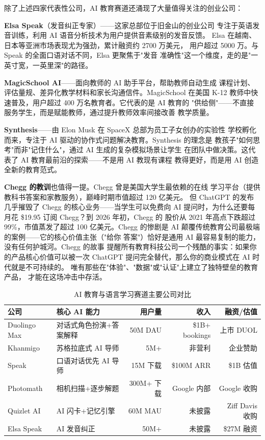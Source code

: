 除了上述四家代表性公司，AI 教育赛道还涌现了大量值得关注的创业公司：

\textbf{Elsa Speak}（发音纠正专家）——这家总部位于旧金山的创业公司
专注于英语发音训练，利用 AI 语音分析技术为用户提供音素级别的发音反馈。
Elsa 在越南、日本等亚洲市场表现尤为强劲，累计融资约 2700 万美元，
用户超过 5000 万。与 Speak 的全面口语对话不同，Elsa 更聚焦于"发音
准确性"这一个维度，走的是"一英寸宽，一英里深"的路径。

\textbf{MagicSchool AI}——面向教师的 AI 助手平台，帮助教师自动生成
课程计划、评估量规、差异化教学材料和家长沟通信件。MagicSchool 在美国
K-12 教师中快速普及，用户超过 400 万名教育者。它代表的是 AI 教育的
"供给侧"——不直接服务学生，而是赋能教师，通过提升教师效率间接改善
教学质量。

\textbf{Synthesis}——由 Elon Musk 在 SpaceX 总部为员工子女创办的实验性
学校孵化而来，专注于 AI 驱动的协作式问题解决教育。Synthesis 的理念是
教孩子"如何思考"而非"记住什么"，通过 AI 生成的复杂模拟场景让学生
在团队中做决策。这代表了 AI 教育最前沿的探索——不是用 AI 教现有课程
教得更好，而是用 AI 创造全新的教育范式。

\textbf{Chegg 的教训}也值得一提。Chegg 曾是美国大学生最依赖的在线
学习平台（提供教科书答案和家教服务），巅峰时期市值超过 120 亿美元。
但 ChatGPT 的发布几乎摧毁了 Chegg 的核心业务——当学生可以免费向 AI
提问时，为什么还要每月花 \$19.95 订阅 Chegg？到 2026 年初，Chegg 的
股价从 2021 年高点下跌超过 99\%，市值蒸发了超过 100 亿美元。Chegg
的惨剧是 AI 颠覆传统教育公司最极端的案例——它的核心价值主张（"给你
答案"）恰好是通用 AI 最容易复制的能力，没有任何护城河。Chegg 的故事
提醒所有教育科技公司一个残酷的事实：如果你的产品核心价值可以被一次
ChatGPT 提问完全替代，那么你的商业模式在 AI 时代就是不可持续的。
唯有那些在"体验"、"数据"或"认证"上建立了独特壁垒的教育产品，
才能在这场冲击中存活。

\begin{table}[htbp]
\centering
\caption{AI 教育与语言学习赛道主要公司对比}
\label{tab:edu-comparison}
\small
\begin{tabularx}{\textwidth}{l X r r r}
\toprule
\rowcolor{figLightGray}
\textbf{公司} & \textbf{核心 AI 能力} & \textbf{用户量} & \textbf{收入} & \textbf{融资/估值} \\
\midrule
Duolingo Max    & 对话式角色扮演+答案解释    & 50M DAU    & \$1B+ bookings  & 上市 DUOL \\
Khanmigo        & 苏格拉底式 AI 导师         & 5M+        & 非营利           & 企业赞助 \\
Speak           & 口语对话优先 AI 导师        & 15M 下载   & \$100M ARR      & \$1B 估值 \\
Photomath       & 相机扫描+逐步解题          & 300M+ 下载 & Google 内部      & Google 收购 \\
Quizlet AI      & AI 闪卡+记忆引擎           & 60M MAU    & 未披露           & Ziff Davis 收购 \\
Elsa Speak      & AI 发音纠正                & 50M+       & 未披露           & \$27M 融资 \\
\bottomrule
\end{tabularx}
\end{table}


